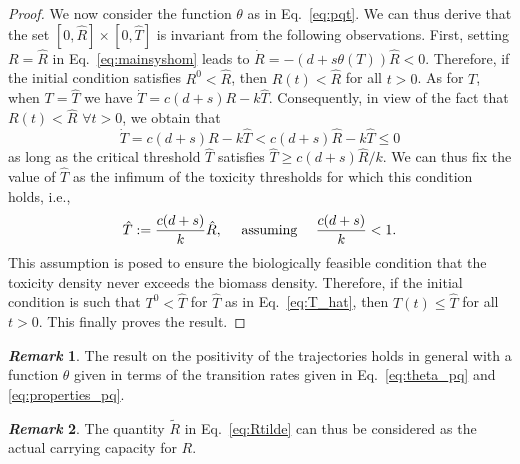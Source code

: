 \documentclass[11pt]{elsarticle}
\theoremstyle{plain}
\theoremstyle{definition}
\theoremstyle{myremark}
\newtheorem*{remark}{\textit{Remark}}
\begin{document}
\begin{proof}
We now consider the function $\theta$ as in Eq.~\eqref{eq:pqt}. We can thus derive that the set $[0, \hat{R}] \times [0, \hat{T}]$ is invariant from the following observations. First, setting $R=\hat{R}$ in Eq.~\eqref{eq:mainsyshom} leads to $\dot{R}=-\left(d+s\theta(T)\right)\hat{R}<0$. Therefore, if the initial condition satisfies $R^0<\hat{R}$, then $R(t)<\hat{R}$ for all $t>0$.  As for $T$, when $T=\hat{T}$ we have $\dot{T}=c(d+s)R-k \hat{T}$. Consequently, in view of the fact that $R(t) < \hat{R}$ $\forall t > 0$, we obtain that
\[
\dot{T}=c(d+s)R-k \hat{T} < c(d+s)\hat{R}-k \hat{T} \leq 0
\]
as long as the critical threshold $\hat{T}$ satisfies
    $\hat{T}\geq c(d+s)\hat{R}/{k} $.
We can thus fix the value of $\hat{T}$ as the infimum of the toxicity thresholds for which this condition holds, i.e.,
\begin{equation}
    \hat{T}:=\dfrac{c(d+s)}{k}\hat{R}, \quad \textnormal{ assuming } \quad \dfrac{c(d+s)}{k}<1.
\label{eq:T_hat}
\end{equation}
This assumption is posed to ensure the biologically feasible condition that the toxicity density never exceeds the biomass density.
Therefore, if the initial condition is such that $T^0 < \hat{T}$ for $\hat{T}$ as in Eq.~\eqref{eq:T_hat}, then $T(t) \leq \hat{T}$ for all $t>0$. This finally proves the result.
\end{proof}

\begin{remark}
    The result on the positivity of the trajectories holds in general with a function $\theta$ given in terms of the transition rates given in Eq.~\eqref{eq:theta_pq} and \eqref{eq:properties_pq}.
\end{remark}

\begin{remark}
    The quantity $\tilde{R}$ in Eq.~\eqref{eq:Rtilde} can thus be considered as the actual carrying capacity for $R$.
\end{remark}

\end{document}
